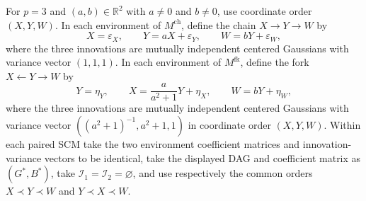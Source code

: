 For \(p=3\) and \((a,b)\in\mathbb R^2\) with \(a\neq0\) and \(b\neq0\), use coordinate order \((X,Y,W)\).  In each environment of \(M^{\mathrm{ch}}\), define the chain \(X\to Y\to W\) by
\[
 X=\varepsilon_X,\qquad Y=aX+\varepsilon_Y,\qquad W=bY+\varepsilon_W,
\]
where the three innovations are mutually independent centered Gaussians with variance vector \((1,1,1)\).  In each environment of \(M^{\mathrm{fk}}\), define the fork \(X\leftarrow Y\to W\) by
\[
 Y=\eta_Y,\qquad X=\frac{a}{a^2+1}Y+\eta_X,\qquad W=bY+\eta_W,
\]
where the three innovations are mutually independent centered Gaussians with variance vector \(((a^2+1)^{-1},a^2+1,1)\) in coordinate order \((X,Y,W)\).  Within each paired SCM take the two environment coefficient matrices and innovation-variance vectors to be identical, take the displayed DAG and coefficient matrix as \((G^*,B^*)\), take \(\mathcal I_1=\mathcal I_2=\varnothing\), and use respectively the common orders \(X\prec Y\prec W\) and \(Y\prec X\prec W\).